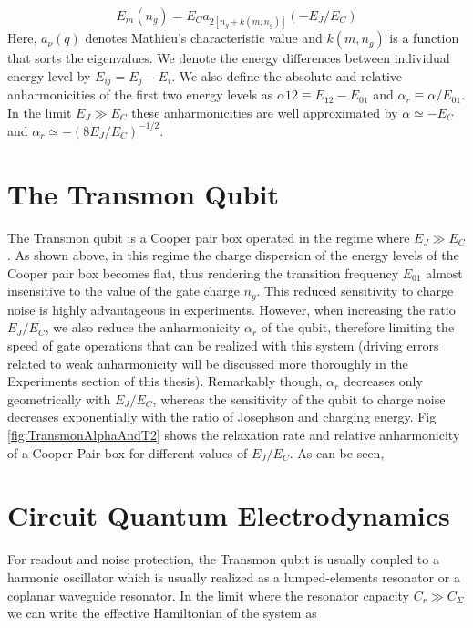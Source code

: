 %
\begin{equation}
E_m(n_g) = E_C a_{2[n_g+k(m,n_g)]}(-E_J/E_C)
\end{equation}
%
Here, $a_\nu(q)$ denotes  Mathieu's characteristic value and $k(m,n_g)$ is a function that sorts the eigenvalues. We denote the energy differences between individual energy level by $E_{ij} = E_j - E_i$. We also define the absolute and relative anharmonicities of the first two energy levels as $\alpha{12} \equiv E_{12}-E_{01}$ and $\alpha_r \equiv \alpha / E_{01}$. In the limit $E_J \gg E_C$ these anharmonicities are well approximated by $\alpha \simeq -E_C$ and $\alpha_r \simeq -(8E_J / E_C)^{-1/2}$.

\section{The Transmon Qubit}

The Transmon qubit is a Cooper pair box operated in the regime where $E_J \gg E_C$. As shown above, in this regime the charge dispersion of the energy levels of the Cooper pair box becomes flat, thus rendering the transition frequency $E_{01}$ almost insensitive to the value of the gate charge $n_g$. This reduced sensitivity to charge noise is highly advantageous in experiments. However, when increasing the ratio $E_J/E_C$, we also reduce the anharmonicity $\alpha_r$ of the qubit, therefore limiting the speed of gate operations that can be realized with this system (driving errors related to weak anharmonicity will be discussed more thoroughly in the Experiments section of this thesis). Remarkably though, $\alpha_r$ decreases only geometrically with $E_J/E_C$, whereas the sensitivity of the qubit to charge noise decreases exponentially with the ratio of Josephson and charging energy. Fig \ref{fig:TransmonAlphaAndT2} shows the relaxation rate and relative anharmonicity of  a Cooper Pair box for different values of $E_J/E_C$. As can be seen,

\section{Circuit Quantum Electrodynamics}

For readout and noise protection, the Transmon qubit is usually coupled to a harmonic oscillator which is usually realized as a lumped-elements resonator or a coplanar waveguide resonator. In the limit where the resonator capacity $C_r \gg C_\Sigma$ we can write the effective Hamiltonian of the system as

